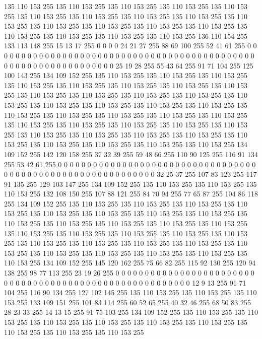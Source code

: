 135 110 153 255 135 110 153 255 135 110 153 255 135 110 153 255 135 110 153 255 135 110 153 255 135 110 153 255 135 110 153 255 135 110 153 255 135 110 153 255 135 110 153 255 135 110 153 255 135 110 153 255 135 110 153 255 135 110 153 255 135 110 153 255
135 110 153 255 135 110 153 255 136 110 154 255 133 113 148 255 15 13 17 255 0 0 0 0 24 21 27 255 88 69 100 255 52 41 61 255 0 0 0 0 0 0 0 0 0 0 0 0 0 0 0 0 0 0 0 0 0 0 0 0 0 0 0 0
0 0 0 0 0 0 0 0 0 0 0 0 0 0 0 0 0 0 0 0 0 0 0 0 0 0 0 0 0 0 0 0 0 0 0 0 25 19 28 255 55 43 64 255 91 71 104 255 125 100 143 255 134 109 152 255 135 110 153 255 135 110 153 255
135 110 153 255 135 110 153 255 135 110 153 255 135 110 153 255 135 110 153 255 135 110 153 255 135 110 153 255 135 110 153 255 135 110 153 255 135 110 153 255 135 110 153 255 135 110 153 255 135 110 153 255 135 110 153 255 135 110 153 255 135 110 153 255
135 110 153 255 135 110 153 255 135 110 153 255 135 110 153 255 135 110 153 255 135 110 153 255 135 110 153 255 135 110 153 255 135 110 153 255 135 110 153 255 135 110 153 255 135 110 153 255 135 110 153 255 135 110 153 255 135 110 153 255 135 110 153 255
135 110 153 255 135 110 153 255 134 109 152 255 142 120 158 255 37 32 39 255 59 48 66 255 110 90 125 255 116 91 134 255 53 42 61 255 0 0 0 0 0 0 0 0 0 0 0 0 0 0 0 0 0 0 0 0 0 0 0 0 0 0 0 0
0 0 0 0 0 0 0 0 0 0 0 0 0 0 0 0 0 0 0 0 0 0 0 0 0 0 0 0 0 0 0 0 32 25 37 255 107 83 123 255 117 91 135 255 129 103 147 255 134 109 152 255 135 110 153 255 135 110 153 255 135 110 153 255
132 108 150 255 107 88 121 255 84 70 94 255 77 65 87 255 104 86 118 255 134 109 152 255 135 110 153 255 135 110 153 255 135 110 153 255 135 110 153 255 135 110 153 255 135 110 153 255 135 110 153 255 135 110 153 255 135 110 153 255 135 110 153 255
135 110 153 255 135 110 153 255 135 110 153 255 135 110 153 255 135 110 153 255 135 110 153 255 135 110 153 255 135 110 153 255 135 110 153 255 135 110 153 255 135 110 153 255 135 110 153 255 135 110 153 255 135 110 153 255 135 110 153 255 135 110 153 255
135 110 153 255 135 110 153 255 134 109 152 255 145 120 162 255 75 66 82 255 115 92 130 255 120 94 138 255 98 77 113 255 23 19 26 255 0 0 0 0 0 0 0 0 0 0 0 0 0 0 0 0 0 0 0 0 0 0 0 0 0 0 0 0
0 0 0 0 0 0 0 0 0 0 0 0 0 0 0 0 0 0 0 0 0 0 0 0 0 0 0 0 12 9 13 255 91 71 104 255 116 90 134 255 127 102 145 255 135 110 153 255 135 110 153 255 135 110 153 255 133 109 151 255 101 83 114 255
60 52 65 255 40 32 46 255 68 50 83 255 28 23 33 255 14 13 15 255 91 75 103 255 134 109 152 255 135 110 153 255 135 110 153 255 135 110 153 255 135 110 153 255 135 110 153 255 135 110 153 255 135 110 153 255 135 110 153 255 135 110 153 255

